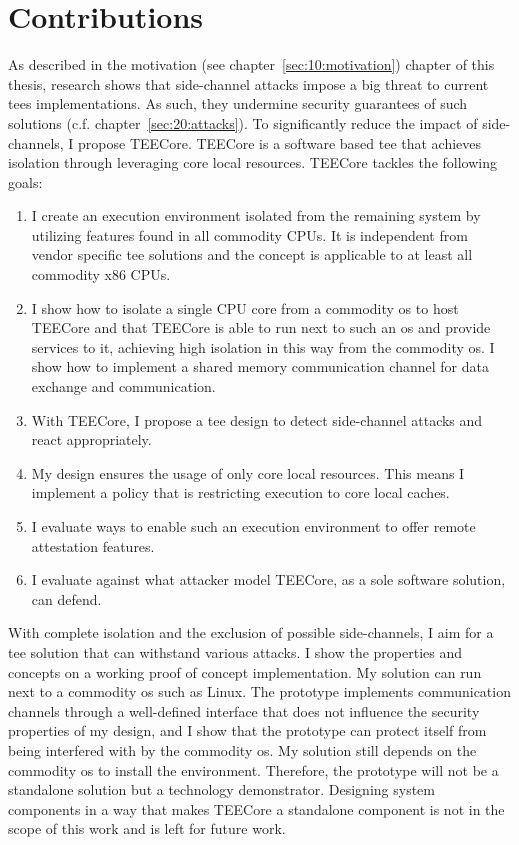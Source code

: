 \section{Contributions}
\label{sec:10:contributions}
As described in the motivation (see chapter~\ref{sec:10:motivation}) chapter of
this thesis, research shows that side-channel attacks impose a big threat to
current \glspl{tee} implementations. As such, they undermine security guarantees
of such solutions (c.f. chapter~\ref{sec:20:attacks}). To significantly reduce
the impact of side-channels, I propose TEECore. TEECore is a software based
\gls{tee} that achieves isolation through leveraging core local resources.
TEECore tackles the following goals:

\begin{enumerate}
  \item I create an execution environment isolated from the remaining system by
    utilizing features found in all commodity CPUs. It is independent from
    vendor specific \gls{tee} solutions and the concept is applicable to at
    least all commodity x86 CPUs.
  \item I show how to isolate a single CPU core from a commodity \gls{os} to
    host TEECore and that TEECore is able to run next to such an \gls{os} and
    provide services to it, achieving high isolation in this way from the
    commodity \gls{os}. I show how to implement a shared memory communication
    channel for data exchange and communication.
  \item With TEECore, I propose a \gls{tee} design to detect side-channel
    attacks and react appropriately.
  \item My design ensures the usage of only core local resources. This means I
    implement a policy that is restricting execution to core local caches.
  \item I evaluate ways to enable such an execution environment to offer
    remote attestation features.
  \item I evaluate against what attacker model TEECore, as a sole software
    solution, can defend.
\end{enumerate}

With complete isolation and the exclusion of possible side-channels, I aim for a
\gls{tee} solution that can withstand various attacks. I show the properties and
concepts on a working proof of concept implementation. My solution can run next
to a commodity \gls{os} such as Linux. The prototype implements
communication channels through a well-defined interface that does not influence
the security properties of my design, and I show that the prototype can protect
itself from being interfered with by the commodity \gls{os}. My solution still
depends on the commodity \gls{os} to install the environment. Therefore, the
prototype will not be a standalone solution but a technology demonstrator.
Designing system components in a way that makes TEECore a standalone component
is not in the scope of this work and is left for future work.
